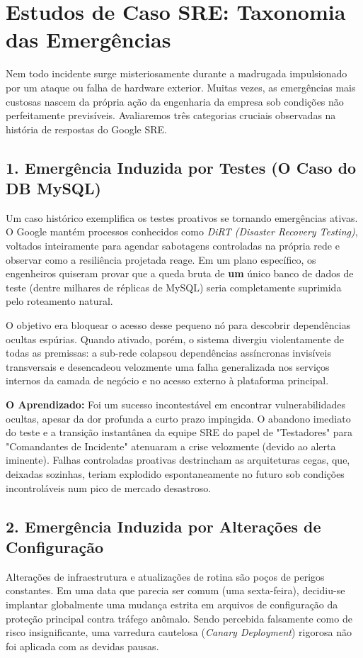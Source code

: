 \documentclass[12pt,a4paper]{report}
\begin{document}
\section{Estudos de Caso SRE: Taxonomia das Emergências}

Nem todo incidente surge misteriosamente durante a madrugada impulsionado por um ataque ou falha de hardware exterior. Muitas vezes, as emergências mais custosas nascem da própria ação da engenharia da empresa sob condições não perfeitamente previsíveis. Avaliaremos três categorias cruciais observadas na história de respostas do Google SRE.

\subsection{1. Emergência Induzida por Testes (O Caso do DB MySQL)}
Um caso histórico exemplifica os testes proativos se tornando emergências ativas. O Google mantém processos conhecidos como \textit{DiRT (Disaster Recovery Testing)}, voltados inteiramente para agendar sabotagens controladas na própria rede e observar como a resiliência projetada reage. Em um plano específico, os engenheiros quiseram provar que a queda bruta de \textbf{um} único banco de dados de teste (dentre milhares de réplicas de MySQL) seria completamente suprimida pelo roteamento natural.

O objetivo era bloquear o acesso desse pequeno nó para descobrir dependências ocultas espúrias. Quando ativado, porém, o sistema divergiu violentamente de todas as premissas: a sub-rede colapsou dependências assíncronas invisíveis transversais e desencadeou velozmente uma falha generalizada nos serviços internos da camada de negócio e no acesso externo à plataforma principal.

\textbf{O Aprendizado:} Foi um sucesso incontestável em encontrar vulnerabilidades ocultas, apesar da dor profunda a curto prazo impingida. O abandono imediato do teste e a transição instantânea da equipe SRE do papel de "Testadores" para "Comandantes de Incidente" atenuaram a crise velozmente (devido ao alerta iminente). Falhas controladas proativas destrincham as arquiteturas cegas, que, deixadas sozinhas, teriam explodido espontaneamente no futuro sob condições incontroláveis num pico de mercado desastroso.

\subsection{2. Emergência Induzida por Alterações de Configuração}
Alterações de infraestrutura e atualizações de rotina são poços de perigos constantes. Em uma data que parecia ser comum (uma sexta-feira), decidiu-se implantar globalmente uma mudança estrita em arquivos de configuração da proteção principal contra tráfego anômalo. Sendo percebida falsamente como de risco insignificante, uma varredura cautelosa (\textit{Canary Deployment}) rigorosa não foi aplicada com as devidas pausas.
\end{document}
